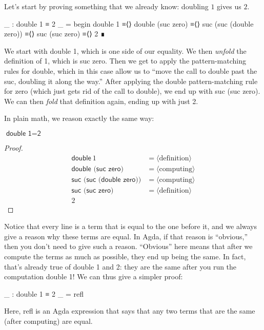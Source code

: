 \documentclass{lecturenotes}
\begin{document}
Let's start by proving something that we already know: doubling $1$ gives us $2$.
\begin{center}
\begin{code}
  _ : double 1 ≡ 2
  _ =
    begin
      double 1
    ≡⟨⟩
      double (suc zero)
    ≡⟨⟩
      suc (suc (double zero))
    ≡⟨⟩
      suc (suc zero)
    ≡⟨⟩
      2
    ∎
\end{code}
\end{center}
We start with \textsf{double 1}, which is one side of our equality.
We then \emph{unfold} the definition of \textsf{1}, which is \textsf{suc zero}.
Then we get to apply the pattern-matching rules for double, which in this case allow us to ``move the call to \textsf{double} past the \textsf{suc}, doubling it along the way.''
After applying the double pattern-matching rule for zero (which just gets rid of the call to \textsf{double}), we end up with \textsf{suc (suc zero)}.
We can then \emph{fold} that definition again, ending up with just \textsf{2}.

\pagebreak
In plain math, we reason exactly the same way:
\begin{thm}
  $\textsf{double 1} = \textsf{2}$
\end{thm}
\begin{proof}
  $$
  \begin{array}{ll}
    \textsf{double}~1 &= \langle\text{definition}\rangle\\
    \textsf{double (suc zero)} &= \langle\text{computing}\rangle\\
    \textsf{suc (suc (double zero))} &= \langle\text{computing}\rangle\\
    \textsf{suc (suc zero)} &= \langle\text{definition}\rangle\\
    2
  \end{array}
  $$
\end{proof}
Notice that every line is a term that is equal to the one before it, and we always give a reason why these terms are equal.
In Agda, if that reason is ``obvious,'' then you don't need to give such a reason.
``Obvious'' here means that after we compute the terms as much as possible, they end up being the same.
In fact, that's already true of \textsf{double 1} and \textsf{2}: they are the same after you run the computation \textsf{double 1}!
We can thus give a simpler proof:
\begin{center}
\begin{code}
  _ : double 1 ≡ 2
  _ = refl
\end{code}
\end{center}
Here, \textsf{refl} is an Agda expression that says that any two terms that are the same (after computing) are equal.
\end{document}
